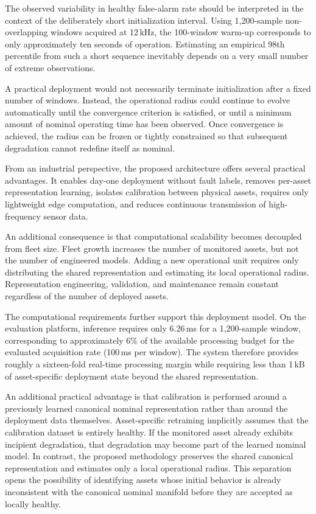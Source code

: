 \documentclass[11pt,a4paper]{article}
\begin{document}
The observed variability in healthy false-alarm rate should be interpreted in the context of the
deliberately short initialization interval. Using 1,200-sample non-overlapping windows acquired
at 12\,kHz, the 100-window warm-up corresponds to only approximately ten seconds of operation.
Estimating an empirical 98th percentile from such a short sequence inevitably depends on a very
small number of extreme observations.

A practical deployment would not necessarily terminate initialization after a fixed number of
windows. Instead, the operational radius could continue to evolve automatically until the
convergence criterion is satisfied, or until a minimum amount of nominal operating time has been
observed. Once convergence is achieved, the radius can be frozen or tightly constrained so that
subsequent degradation cannot redefine itself as nominal.

From an industrial perspective, the proposed architecture offers several practical advantages.
It enables day-one deployment without fault labels, removes per-asset representation learning,
isolates calibration between physical assets, requires only lightweight edge computation, and
reduces continuous transmission of high-frequency sensor data.

An additional consequence is that computational scalability becomes decoupled from fleet size.
Fleet growth increases the number of monitored assets, but not the number of engineered models.
Adding a new operational unit requires only distributing the shared representation and estimating
its local operational radius. Representation engineering, validation, and maintenance remain
constant regardless of the number of deployed assets.

The computational requirements further support this deployment model. On the evaluation
platform, inference requires only 6.26\,ms for a 1,200-sample window, corresponding to
approximately 6\% of the available processing budget for the evaluated acquisition rate
(100\,ms per window). The system therefore provides roughly a sixteen-fold real-time processing
margin while requiring less than 1\,kB of asset-specific deployment state beyond the shared
representation.

An additional practical advantage is that calibration is performed around a previously learned
canonical nominal representation rather than around the deployment data themselves.
Asset-specific retraining implicitly assumes that the calibration dataset is entirely healthy.
If the monitored asset already exhibits incipient degradation, that degradation may become part
of the learned nominal model. In contrast, the proposed methodology preserves the shared
canonical representation and estimates only a local operational radius. This separation opens
the possibility of identifying assets whose initial behavior is already inconsistent with the
canonical nominal manifold before they are accepted as locally healthy.
\end{document}

